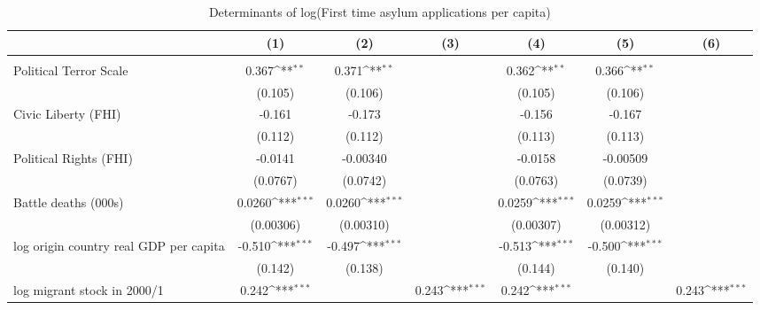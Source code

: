 \documentclass[a4paper,12pt]{article}
\newcommand{\sym}[1]{\rlap{#1}}
\begin{document}
\begin{table}\centering
	\footnotesize
\def\sym#1{\ifmmode^{#1}\else\(^{#1}\)\fi}
\caption{Determinants of log(First time asylum applications per capita)}
\begin{tabular}{l*{6}{c}}
	\hline\hline
	&\multicolumn{1}{c}{(1)}         &\multicolumn{1}{c}{(2)}         &\multicolumn{1}{c}{(3)}         &\multicolumn{1}{c}{(4)}         &\multicolumn{1}{c}{(5)}         &\multicolumn{1}{c}{(6)}         \\
	\hline
	&\\
	Political Terror Scale                  &     0.367\sym{**} &     0.371\sym{**} &                   &     0.362\sym{**} &     0.366\sym{**} &                   \\
	&   (0.105)         &   (0.106)         &                   &   (0.105)         &   (0.106)         &                   \\
	[0.3em]
	Civic Liberty (FHI)                     &    -0.161         &    -0.173         &                   &    -0.156         &    -0.167         &                   \\
	&   (0.112)         &   (0.112)         &                   &   (0.113)         &   (0.113)         &                   \\
	[0.3em]
	Political Rights (FHI)                  &   -0.0141         &  -0.00340         &                   &   -0.0158         &  -0.00509         &                   \\
	&  (0.0767)         &  (0.0742)         &                   &  (0.0763)         &  (0.0739)         &                   \\
	[0.3em]
	Battle deaths (000s)                     &    0.0260\sym{***}&    0.0260\sym{***}&                   &    0.0259\sym{***}&    0.0259\sym{***}&                   \\
	& (0.00306)         & (0.00310)         &                   & (0.00307)         & (0.00312)         &                   \\
	[0.3em]
	log origin country real GDP per capita  &    -0.510\sym{***}&    -0.497\sym{***}&                   &    -0.513\sym{***}&    -0.500\sym{***}&                   \\
	&   (0.142)         &   (0.138)         &                   &   (0.144)         &   (0.140)         &                   \\
	[0.3em]
	log migrant stock in 2000/1             &     0.242\sym{***}&                   &     0.243\sym{***}&     0.242\sym{***}&                   &     0.243\sym{***}\\

\end{tabular}
\end{table}
\end{document}
